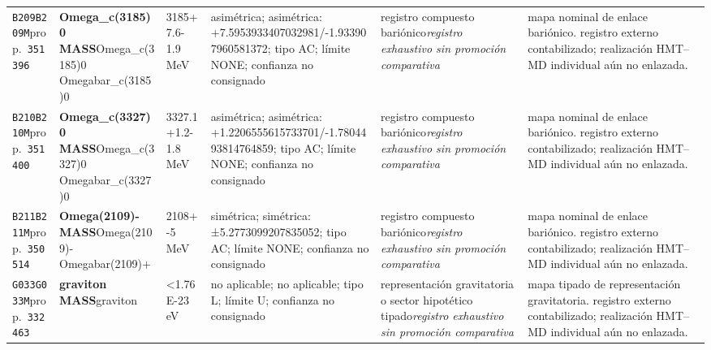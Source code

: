 \begin{landscape}
\begin{longtable}{L{1.85cm}L{4.45cm}L{2.35cm}L{4.05cm}L{3.35cm}L{7.15cm}}
\texttt{B209}\newline \texttt{B209M}\newline prop.\ \texttt{351396} & \textbf{Omega\_\allowbreak{}c(3185)0 MASS}\newline Omega\_\allowbreak{}c(3185)0 \textbar{}\allowbreak{} Omegabar\_\allowbreak{}c(3185)0 & 3185+7.6-1.9\,MeV & asimétrica; asimétrica: +7.5953933407032981/-1.933907960581372; tipo AC; límite NONE; confianza no consignado & registro compuesto bariónico\newline \emph{registro exhaustivo sin promoción comparativa} & mapa nominal de enlace bariónico. registro externo contabilizado; realización HMT--MD individual aún no enlazada. \\
\texttt{B210}\newline \texttt{B210M}\newline prop.\ \texttt{351400} & \textbf{Omega\_\allowbreak{}c(3327)0 MASS}\newline Omega\_\allowbreak{}c(3327)0 \textbar{}\allowbreak{} Omegabar\_\allowbreak{}c(3327)0 & 3327.1+1.2-1.8\,MeV & asimétrica; asimétrica: +1.2206555615733701/-1.7804493814764859; tipo AC; límite NONE; confianza no consignado & registro compuesto bariónico\newline \emph{registro exhaustivo sin promoción comparativa} & mapa nominal de enlace bariónico. registro externo contabilizado; realización HMT--MD individual aún no enlazada. \\
\texttt{B211}\newline \texttt{B211M}\newline prop.\ \texttt{350514} & \textbf{Omega(2109)- MASS}\newline Omega(2109)- \textbar{}\allowbreak{} Omegabar(2109)+ & 2108+-5\,MeV & simétrica; simétrica: ±5.2773099207835052; tipo AC; límite NONE; confianza no consignado & registro compuesto bariónico\newline \emph{registro exhaustivo sin promoción comparativa} & mapa nominal de enlace bariónico. registro externo contabilizado; realización HMT--MD individual aún no enlazada. \\
\texttt{G033}\newline \texttt{G033M}\newline prop.\ \texttt{332463} & \textbf{graviton MASS}\newline graviton & \textless{}1.76E-23\,eV & no aplicable; no aplicable; tipo L; límite U; confianza no consignado & representación gravitatoria o sector hipotético tipado\newline \emph{registro exhaustivo sin promoción comparativa} & mapa tipado de representación gravitatoria. registro externo contabilizado; realización HMT--MD individual aún no enlazada. \\

\end{longtable}
\end{landscape}
